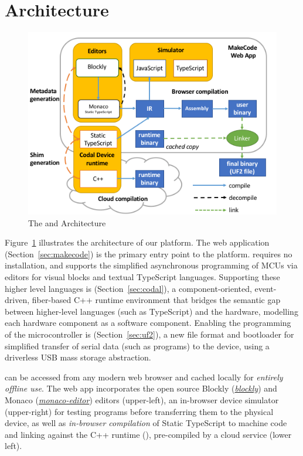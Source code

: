  \section{Architecture}

\begin{figure}[t]
    \includegraphics[width=\columnwidth]{images/arch-diagram.png}
    \setlength{\belowcaptionskip}{-10pt}
    \caption{\label{fig:makecode}The \MC and \CO Architecture}
\end{figure}

Figure~\ref{fig:makecode} illustrates the architecture of our platform. The \MC web application (Section~\ref{sec:makecode}) is the primary entry point to the platform. \MC requires no installation, and supports the simplified asynchronous programming of MCUs via editors for visual blocks and textual TypeScript languages. Supporting these higher level languages is \CO (Section~\ref{sec:codal}), a component-oriented, event-driven, fiber-based C++ runtime environment that bridges the semantic gap between higher-level languages (such as TypeScript) and the hardware, modelling each hardware component as a software component. Enabling the programming of the microcontroller is \UF (Section~\ref{sec:uf2}), a new file format and bootloader for simplified transfer of serial data (such as programs) to the device, using a driverless USB mass storage abstraction.

\MC can be accessed from any modern web browser and cached locally for \emph{entirely offline use}. The \MC web app incorporates the open source Blockly (\emph{\href{https://github.com/google/blockly}{blockly}}) and Monaco (\emph{\href{https://github.com/Microsoft/monaco-editor}{monaco-editor}}) editors (upper-left), an in-browser device simulator (upper-right) for testing programs before transferring them to the physical device, as well as \emph{in-browser compilation} of Static TypeScript to machine code and linking against the C++ runtime (\emph{\CON}), pre-compiled by a cloud service (lower left).

